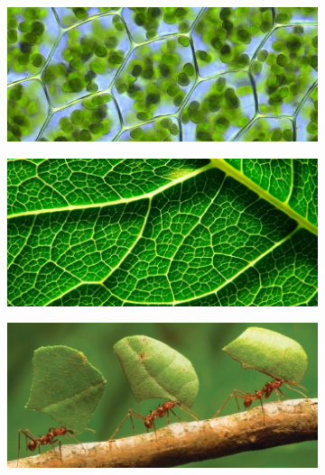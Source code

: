 \documentclass[a4paper,11pt]{book}
\theoremstyle{definition}
\newif\ifen
\newif\ifes
\newcommand{\En}[1]{\ifen#1\fi}
\newcommand{\Es}[1]{\ifes#1\fi}
\begin{document}
\begin{figure}[ht!]
 \begin{subfigure}[b]{0.25\textwidth} \centering
  \includegraphics[width=\linewidth]{static/cloroplastos.jpg}
  \caption*{\En{Eukaryotic cells}}
  \end{subfigure}
 \begin{subfigure}[b]{0.23\textwidth} \centering
  \includegraphics[width=\linewidth]{static/fotosintesis.jpg}
  \caption*{\En{Organisms}}
  \end{subfigure}
  \begin{subfigure}[b]{0.235\textwidth} \centering
 \includegraphics[width=\linewidth]{static/hormigas2.jpg}
  \caption*{\En{Societies}}
 \end{subfigure}
 \begin{subfigure}[b]{0.235\textwidth} \centering

\end{subfigure}
\end{figure}
\end{document}
